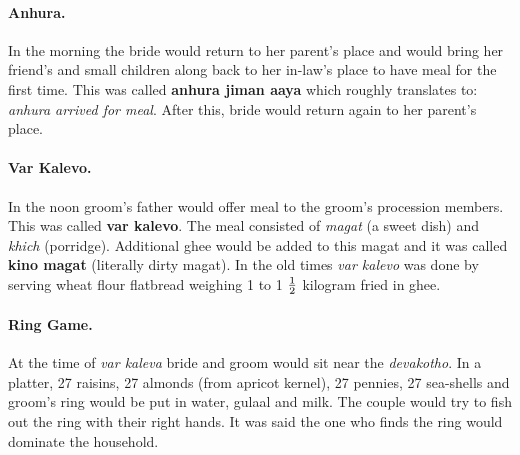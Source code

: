 \paragraph{Anhura.} In the morning the bride would return to her parent's place
and would bring her friend's and small children along back to her in-law's
place to have meal for the first time. This was called \textbf{anhura jiman
aaya} which roughly translates to: \textit{anhura arrived for meal}. After
this, bride would return again to her parent's place.

\paragraph{Var Kalevo.} In the noon groom's father would offer meal to the
groom's procession members. This was called \textbf{var kalevo}. The meal
consisted of \textit{magat} (a sweet dish) and \textit{khich} (porridge).
Additional ghee would be added to this magat and it was called \textbf{kino
magat} (literally dirty magat). In the old times \textit{var kalevo} was done by
serving wheat flour flatbread weighing 1 to 1 $1\over2$ kilogram fried in
ghee.

\paragraph{Ring Game.} At the time of \textit{var kaleva} bride and groom would
sit near the \textit{devakotho}. In a platter, 27 raisins, 27 almonds (from
apricot kernel), 27 pennies, 27 sea-shells and groom's ring would be
put in water, gulaal and milk. The couple would try to fish out the ring with
their right hands. It was said the one who finds the ring would dominate the
household.

